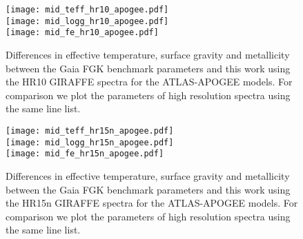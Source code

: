 \documentclass[fleqn,usenatbib]{mnras}
\begin{document}
\begin{figure}
  \centering
   \texttt{[image: mid\_teff\_hr10\_apogee.pdf]} \\
   \texttt{[image: mid\_logg\_hr10\_apogee.pdf]} \\
   \texttt{[image: mid\_fe\_hr10\_apogee.pdf]} 
  \caption{Differences in effective temperature, surface gravity and metallicity between the Gaia FGK benchmark parameters and this work using the HR10 GIRAFFE spectra for the ATLAS-APOGEE models. For 
  comparison we plot the parameters of high resolution spectra using the same line list.}
  \label{mid_res_hr10_apogee}
  \end{figure}

\begin{figure}
  \centering
   \texttt{[image: mid\_teff\_hr15n\_apogee.pdf]} \\
   \texttt{[image: mid\_logg\_hr15n\_apogee.pdf]} \\
   \texttt{[image: mid\_fe\_hr15n\_apogee.pdf]}
  \caption{Differences in effective temperature, surface gravity and metallicity between the Gaia FGK benchmark parameters and this work using the HR15n GIRAFFE spectra for the ATLAS-APOGEE models. For 
  comparison we plot the parameters of high resolution spectra using the same line list.}
  \label{mid_res_hr15n_apogee}
  \end{figure}
\end{document}
